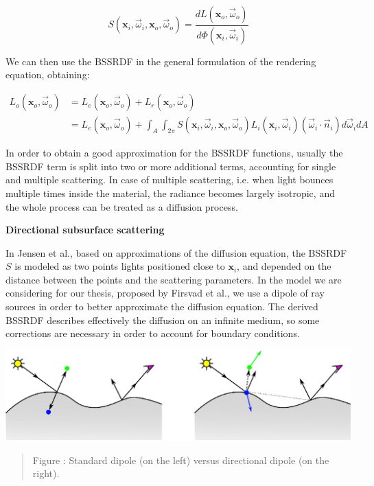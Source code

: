 \documentclass[landscape,a0b,final,a4resizeable]{a0poster}
\newenvironment{poster}{
	\begin{center} \begin{minipage}[c]{0.98\textwidth} }{
	\end{minipage} \end{center}
}
\newcommand{\fcaption}[1]{
  \vspace{0.3cm}
  \begin{quote}
	\centering
    {{\sc Figure} \arabic{figure}: \small {#1}}
  \end{quote}
  \vspace{0.6cm}
  \stepcounter{figure}
}
\begin{document}
\begin{poster}
\begin{multicols}{3}
$$
S(\mathbf{x}_i, \vec{\omega}_i,\mathbf{x}_o, \vec{\omega}_o) = \frac{dL(\mathbf{x}_o, \vec{\omega}_o)}{d\Phi(\mathbf{x}_i,\vec{\omega}_i)}
$$

We can then use the BSSRDF in the general formulation of the rendering equation\cite{Jensen:2001:PMS:383259.383319}, obtaining:

\begin{equation}
\label{eq:eq1}
\begin{aligned}
L_o(\mathbf{x}_o, \vec{\omega}_o) &= L_e(\mathbf{x}_o, \vec{\omega}_o) + L_r(\mathbf{x}_o, \vec{\omega}_o) \\
&= L_e(\mathbf{x}_o, \vec{\omega}_o) + \int_A \int_{2\pi} S(\mathbf{x}_i, \vec{\omega}_i,\mathbf{x}_o, \vec{\omega}_o) L_i(\mathbf{x}_i, \vec{\omega}_i)(\vec{\omega}_i \cdot \vec{n}_i) d\vec{\omega}_i dA
\end{aligned}
\end{equation}

In order to obtain a good approximation for the BSSRDF functions, usually the BSSRDF term is split into two or more additional terms, accounting for single and multiple scattering. In case of multiple scattering, i.e. when light bounces multiple times inside the material, the radiance becomes largely isotropic, and the whole process can be treated as a diffusion process\cite{books/daglib/0093591}.  

\vspace{0.6cm}
{\bf Directional subsurface scattering}
\vspace{0.6cm}

In Jensen et al.\cite{Jensen:2001:PMS:383259.383319}, based on approximations of the diffusion equation, the BSSRDF $S$ is modeled as two points lights positioned close to $\mathbf{x}_i$, and depended on the distance between the points and the scattering parameters. In the model we are considering for our thesis\cite{IMM2013-06646}, proposed by Firsvad et al., we use a dipole of ray sources in order to better approximate the diffusion equation. The derived BSSRDF describes effectively the diffusion on an infinite medium, so some corrections are necessary in order to account for boundary conditions.

\begin{center}
\includegraphics[scale = 1.4 ]{./images/comparison.eps} 
\fcaption{Standard dipole (on the left) versus directional dipole (on the right). }
\end{center}


\end{multicols}
\end{poster}
\end{document}
